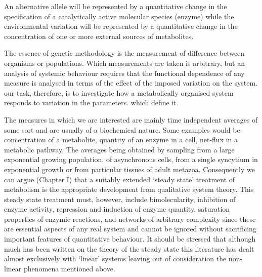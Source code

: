 An alternative allele will be represented by a quantitative change in the specification of a catalytically active molecular species (enzyme) while the environmental variation will be represented by a quantitative change in the concentration of one or more external sources of metabolites.

The essence of genetic methodology is the measurement of difference between organisms or populations. Which measurements are taken is arbitrary, but an analysis of systemic behaviour requires that the functional dependence of any measure is analysed in terms of the effect of the imposed variation on the system. our task, therefore, is to investigate how a metabolically organised system responds to variation in the parameters. which define it.

The measures in which we are interested are mainly time independent averages of some sort and are usually of a biochemical nature. Some examples would be concentration of a metabolite, quantity of an enzyme in a cell, net-flux in a metabolic pathway. The averages being obtained by sampling from a large exponential growing population, of asynchronous cells, from a single syncytium in exponential growth or from particular tissues of adult metazoa. Consequently we can argue (Chapter I) that a suitably extended `steady state' treatment of metabolism is the appropriate development from qualitative system theory. This steady state treatment must, however, include bimolecularity, inhibition of enzyme activity, repression and induction of enzyme quantity, saturation properties of enzymic reactions, and networks of arbitrary complexity since these are essential aspects of any real system and cannot be ignored without sacrificing important features of quantitative behaviour. It should be stressed that although much has been written on the theory of the steady state this literature has dealt almost exclusively with `linear' systems leaving out of consideration the non-linear phenomena mentioned above.

